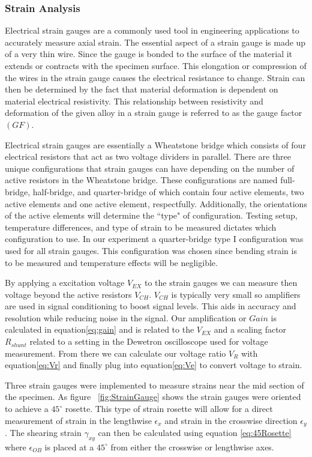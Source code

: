 \documentclass[12pt]{article}
\begin{document}
\subsubsection{Strain Analysis}
Electrical strain gauges are a commonly used tool in engineering applications to accurately measure axial strain. The essential aspect of a strain gauge is made up of a very thin wire. Since the gauge is bonded to the surface of the material it extends or contracts with the specimen surface.  This elongation or compression of the wires in the strain gauge causes the electrical resistance to change. Strain can then be determined by the fact that material deformation is dependent on material electrical resistivity.  This relationship between resistivity and deformation of the given alloy in a strain gauge is referred to as the gauge factor $(GF)$.  

Electrical strain gauges are essentially a Wheatstone bridge which consists of four  electrical resistors that act as two voltage dividers in parallel. There are three unique configurations that strain gauges can have depending on the number of active resistors in the Wheatstone bridge. These configurations are named full-bridge, half-bridge, and quarter-bridge of which contain four active elements,  two active elements and one active element, respectfully. Additionally, the orientations of the active elements will determine the  ``type" of configuration. Testing setup, temperature differences, and type of strain to be measured dictates which configuration  to use.  In our experiment a quarter-bridge type I configuration was used for all strain gauges. This configuration was chosen since bending strain is to be measured and temperature effects will be negligible. 

By applying a excitation voltage $V_{EX} $ to the strain gauges we can measure then voltage  beyond the active resistors $V_{CH} $.  $V_{CH}$ is typically  very small  so amplifiers are used in signal conditioning to boost signal levels. This aids in accuracy and resolution while reducing noise in the signal. Our amplification  or $Gain$  is calculated in equation\ref{eq:gain}  and is related to the $V_{EX}$ and  a scaling factor $R_{shunt}$  related to a setting in the Dewetron oscilloscope used  for voltage measurement.  From there we can calculate our voltage ratio $V_{R}$ with equation\ref{eq:Vr}  and finally plug into equation\ref{eq:Ve} to convert voltage to strain.


Three strain gauges were implemented to measure strains near the mid section of the specimen. As figure ~\ref{fig:StrainGauge} shows the strain gauges were oriented to achieve a $45^{\circ}$ rosette. This type of strain rosette  will allow for a direct measurement of strain in the lengthwise $\epsilon_{x} $ and strain in the crosswise direction $\epsilon_{y}$.  The shearing strain $\gamma_{xy}$ can then be calculated using equation \ref{eq:45Rosette} where $\epsilon_{OB} $ is placed at a $45^{\circ} $ from either the crosswise or lengthwise axes.
\end{document}
